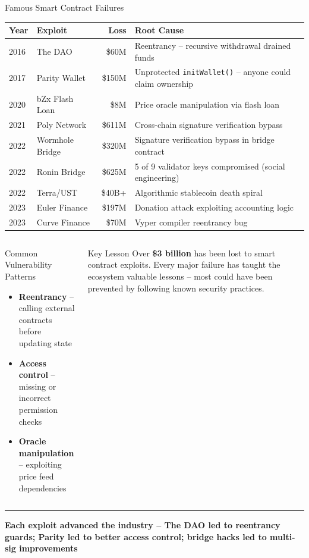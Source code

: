 \documentclass[8pt,aspectratio=169]{beamer}
\newcommand{\bottomnote}[1]{\vfill\vspace{-2mm}\textcolor{mllavender2}{\rule{\textwidth}{0.4pt}}\vspace{1mm}\footnotesize\textbf{#1}}
\begin{document}
\begin{frame}{Famous Smart Contract Failures}
\centering
\vspace{2mm}
\footnotesize
\begin{tabular}{l l r l}
\toprule
\textbf{Year} & \textbf{Exploit} & \textbf{Loss} & \textbf{Root Cause} \\
\midrule
\rowcolor{mllavender4}
2016 & The DAO & \$60M & Reentrancy -- recursive withdrawal drained funds \\
2017 & Parity Wallet & \$150M & Unprotected \texttt{initWallet()} -- anyone could claim ownership \\
\rowcolor{mllavender4}
2020 & bZx Flash Loan & \$8M & Price oracle manipulation via flash loan \\
2021 & Poly Network & \$611M & Cross-chain signature verification bypass \\
\rowcolor{mllavender4}
2022 & Wormhole Bridge & \$320M & Signature verification bypass in bridge contract \\
2022 & Ronin Bridge & \$625M & 5 of 9 validator keys compromised (social engineering) \\
\rowcolor{mllavender4}
2022 & Terra/UST & \$40B+ & Algorithmic stablecoin death spiral \\
2023 & Euler Finance & \$197M & Donation attack exploiting accounting logic \\
\rowcolor{mllavender4}
2023 & Curve Finance & \$70M & Vyper compiler reentrancy bug \\
\bottomrule
\end{tabular}
\vspace{4mm}
\begin{columns}[T]
\begin{block}{Common Vulnerability Patterns}
\footnotesize
\begin{itemize}
  \item \textcolor{mlred}{\textbf{Reentrancy}} -- calling external contracts before updating state
  \item \textcolor{mlorange}{\textbf{Access control}} -- missing or incorrect permission checks
  \item \textcolor{mlblue}{\textbf{Oracle manipulation}} -- exploiting price feed dependencies
\end{itemize}
\end{block}
\begin{alertblock}{Key Lesson}
\footnotesize
Over \textbf{\$3 billion} has been lost to smart contract exploits. Every major failure has taught the ecosystem valuable lessons -- most could have been prevented by following known security practices.
\end{alertblock}
\end{columns}
\bottomnote{Each exploit advanced the industry -- The DAO led to reentrancy guards; Parity led to better access control; bridge hacks led to multi-sig improvements}
\end{frame}
\end{document}
